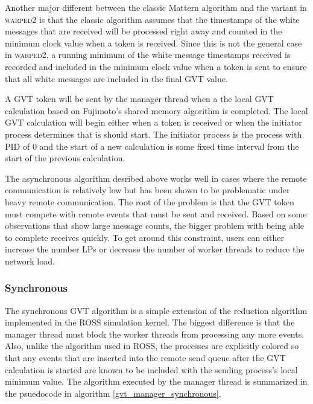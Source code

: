 \documentclass[11pt]{book}
\begin{document}
Another major different between the classic Mattern algorithm and the variant in \textsc{warped2}
is that the classic algorithm assumes that the timestamps of the white messages that are received
will be processed right away and counted in the minimum clock value when a token is received.
Since this is not the general case in \textsc{warped2}, a running minimum of the white message
timestamps received is recorded and included in the minimum clock value when a token is sent to
ensure that all white messages are included in the final GVT value.

A GVT token will be sent by the manager thread when a the local GVT calculation based on
Fujimoto's shared memory algorithm is completed. The local GVT calculation will begin either
when a token is received or when the initiator process determines that is should start. The
initiator process is the process with PID of 0 and the start of a new calculation is some fixed
time interval from the start of the previous calculation. 

The asynchronous algorithm desribed above works well in cases where the remote communication is
relatively low but has been shown to be problematic under heavy remote communication.
The root of the problem is that the GVT token must compete with remote events that must be
sent and received. Based on some observations that show large message counts, the bigger problem
with being able to complete receives quickly. To get around this constraint, users can either
increase the number LPs or decrease the number of worker threads to reduce the network load.

\subsubsection{Synchronous}

The synchronous GVT algorithm is a simple extension of the reduction algorithm implemented
in the ROSS simulation kernel. The biggest difference is that the manager thread must block
the worker threads from processing any more events. Also, unlike the algorithm used in ROSS,
the processes are explicitly colored so that any events that are inserted into the remote send
queue after the GVT calculation is started are known to be included with the sending process's
local minimum value. The algorithm executed by the manager thread is summarized in the psuedocode
in algorithm \ref{gvt_manager_synchronous}.
\end{document}
